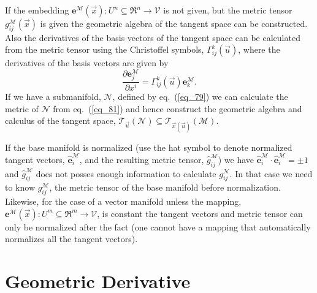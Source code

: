 \documentclass[12pt]{report}
\newcommand{\bm}[1]{\boldsymbol{#1}}
\newcommand{\bfrac}[2]{\displaystyle\frac{#1}{#2}}
\newcommand{\lp}{\left (}
\newcommand{\rp}{\right )}
\newcommand{\pdiff}[2]{\bfrac{\partial {#1}}{\partial {#2}}}
\newcommand{\f}[2]{{#1}\lp {#2} \rp}
\newcommand{\be}{\begin{equation}}
\newcommand{\ee}{\end{equation}}
\newcommand{\Tn}[2]{\f{\mathcal{T}_{#2}}{#1}}
\begin{document}
If the embedding $\f{\bm{e}^{\mathcal{M}}}{\vec{x}}\colon U^{n}\subseteq\Re^{n}\rightarrow \mathcal{V}$ is not given,
but the metric tensor $\f{g_{ij}^{\mathcal{M}}}{\vec{x}}$ is given the geometric algebra of the
tangent space can be constructed.  Also the derivatives of the basis vectors of the tangent space can
be calculated from the metric tensor using the Christoffel symbols, $\f{\Gamma_{ij}^{k}}{\vec{u}}$, where the derivatives of the basis vectors are given by
\be
    \pdiff{\bm{e}_{j}^{\mathcal{M}}}{x^{i}} =\f{\Gamma_{ij}^{k}}{\vec{u}}\bm{e}_{k}^{\mathcal{M}}.
\ee
If we have a submanifold, $\mathcal{N}$, defined by eq.~(\ref{eq_79}) we can calculate the metric of
$\mathcal{N}$ from eq.~(\ref{eq_81}) and hence construct the geometric algebra and calculus of the
tangent space, $\Tn{\mathcal{N}}{\vec{u}}\subseteq \Tn{\mathcal{M}}{\f{\vec{x}}{\vec{u}}}$.

If the base manifold is normalized (use the hat symbol to denote normalized tangent vectors,
 $\hat{\bm{e}}_{i}^{\mathcal{M}}$, and the resulting metric tensor, $\hat{g}_{ij}^{\mathcal{M}}$) we have
$\hat{\bm{e}}_{i}^{\mathcal{M}}\cdot\hat{\bm{e}}_{i}^{\mathcal{M}} = \pm 1$ and $\hat{g}_{ij}^{\mathcal{M}}$ does not posses enough
information to calculate $g_{ij}^{\mathcal{N}}$.  In that case we need to know $g_{ij}^{\mathcal{M}}$, the
metric tensor of the base manifold before normalization.  Likewise, for the case of a vector
manifold unless the mapping, $\f{\bm{e}^{\mathcal{M}}}{\vec{x}}\colon U^{m}\subseteq\Re^{m}\rightarrow \mathcal{V}$, is
constant the tangent vectors and metric tensor can only be normalized after the fact (one cannot have a
mapping that automatically normalizes all the tangent vectors).

\section{Geometric Derivative}
\end{document}
